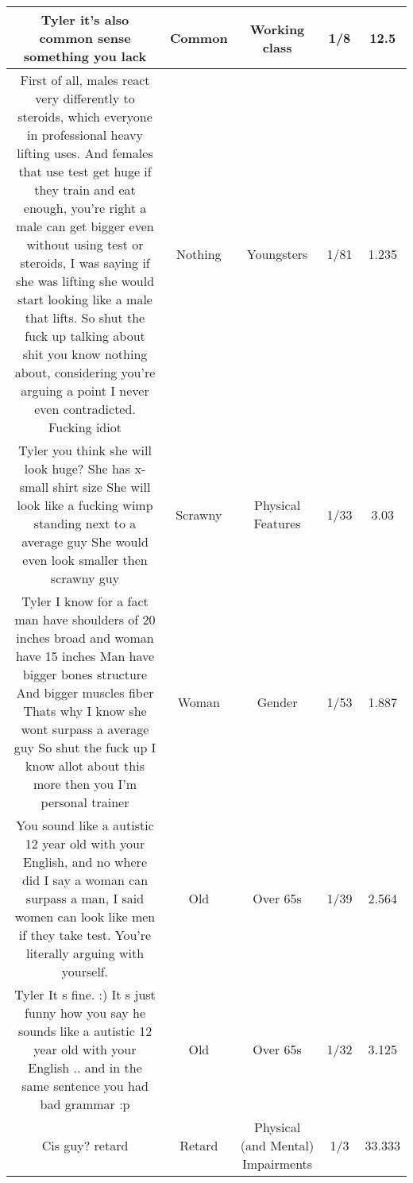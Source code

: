 \documentclass[11pt]{article}
\newlength\mylength
\begin{document}
\begin{center}
\begin{longtable}{|C{.40\mylength}|C{.30\mylength}|C{.15\mylength}|C{.15\mylength}|C{.15\mylength}|}
  Tyler it's also common sense something you lack  & Common & Working class & 1/8 & 12.5 \\  \hline
  First of all, males react very differently to steroids, which everyone in professional heavy lifting uses. And females that use test get huge if they train and eat enough, you're right a male can get bigger even without using test or steroids, I was saying if she was lifting she would start looking like a male that lifts. So shut the fuck up talking about shit you know nothing about, considering you're arguing a point I never even contradicted. Fucking idiot  & Nothing & Youngsters & 1/81 & 1.235 \\  \hline
  Tyler you think she will look huge? She has x-small shirt size  She will look like a fucking wimp standing next to a average guy  She would even look smaller then scrawny guy  & Scrawny & Physical Features & 1/33 & 3.03 \\  \hline
  Tyler I know for a fact man have shoulders of 20 inches broad and woman have 15 inches Man have bigger bones structure And bigger muscles fiber  Thats why I know she  wont surpass a average guy  So shut the fuck up I know allot about this more then you  I'm personal trainer  & Woman & Gender & 1/53 & 1.887 \\  \hline
  You sound like a autistic 12 year old with your English, and no where did I say a woman can surpass a man, I said women can look like men if they take test. You're literally arguing with yourself.  & Old & Over 65s & 1/39 & 2.564 \\  \hline
  Tyler It s fine. :)  It s just funny how you say he  sounds like a autistic 12 year old with your English ..  and in the same sentence you had bad grammar :p  & Old & Over 65s & 1/32 & 3.125 \\  \hline
  Cis guy? retard  & Retard & Physical (and Mental) Impairments & 1/3 & 33.333 \\  \hline

\end{longtable}
\end{center}
\end{document}
